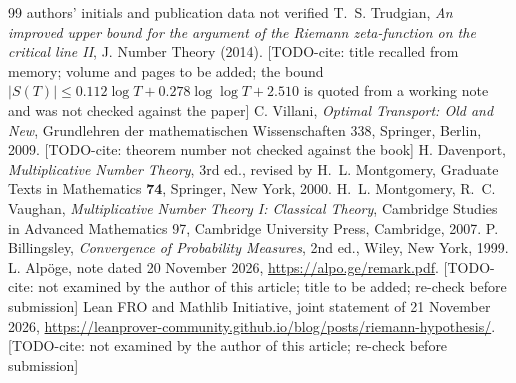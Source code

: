 \documentclass[11pt]{amsart}
\theoremstyle{definition}
\numberwithin{equation}{section}
\newcommand{\todocite}[1]{\textsf{[TODO-cite: #1]}}
\begin{document}
\begin{thebibliography}{99}
{authors' initials and publication data not verified}
 T.~S. Trudgian, \emph{An improved upper bound for the
argument of the Riemann zeta-function on the critical line II},
J. Number Theory (2014). \todocite{title recalled from memory; volume
and pages to be added; the bound
$|S(T)|\le0.112\log T+0.278\log\log T+2.510$ is quoted from a working
note and was not checked against the paper}
 C. Villani, \emph{Optimal Transport: Old and New},
Grundlehren der mathematischen Wissenschaften 338, Springer, Berlin,
2009. \todocite{theorem number not checked against the book}
 H. Davenport, \emph{Multiplicative Number Theory},
3rd ed., revised by H.~L. Montgomery, Graduate Texts in Mathematics
\textbf{74}, Springer, New York, 2000.
 H.~L. Montgomery, R.~C. Vaughan, \emph{Multiplicative
Number Theory I: Classical Theory}, Cambridge Studies in Advanced
Mathematics 97, Cambridge University Press, Cambridge, 2007.
 P. Billingsley, \emph{Convergence of Probability
Measures}, 2nd ed., Wiley, New York, 1999.
 L. Alp\"oge, note dated 20 November 2026,
\url{https://alpo.ge/remark.pdf}. \todocite{not examined by the
author of this article; title to be added; re-check before
submission}
 Lean FRO and Mathlib Initiative, joint statement of
21 November 2026,
\url{https://leanprover-community.github.io/blog/posts/riemann-hypothesis/}.
\todocite{not examined by the author of this article; re-check
before submission}
\end{thebibliography}
\end{document}
